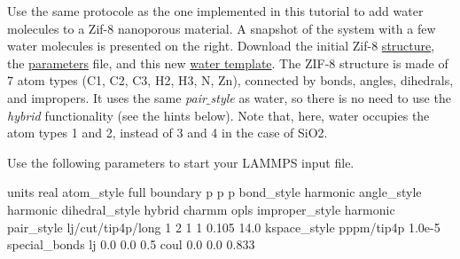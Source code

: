 \noindent Use the same protocole as the one implemented in this tutorial to add water
molecules to a Zif-8 nanoporous material. A snapshot of the system with a 
few water molecules is presented on the right.
Download the initial Zif-8 \href{../../../../../inputs/level3/water-adsorption-in-silica/Exercises/Zif-8/zif-8.data}{structure}, the \href{../../../../../inputs/level3/water-adsorption-in-silica/Exercises/Zif-8/parm.lammps}{parameters} file, and this
new \href{../../../../../inputs/level3/water-adsorption-in-silica/Exercises/Zif-8/water.mol}{water template}. The ZIF-8 structure is made of 7 atom types (C1, C2, C3, H2, H3, N, Zn), connected
by bonds, angles, dihedrals, and impropers. It uses the same \textit{pair$\_$style} as water,
so there is no need to use the \textit{hybrid} functionality (see the hints below).
Note that, here, water occupies the atom types 1 and 2, instead of 3 and 4 in the case of SiO2.

\begin{tcolorbox}[colback=mylightblue!5!white,colframe=mylightblue!75!black,title=Hints]
Use the following parameters to start your LAMMPS input file.
\begin{lcverbatim}
units real
atom_style full
boundary p p p
bond_style harmonic
angle_style harmonic
dihedral_style hybrid charmm opls
improper_style harmonic
pair_style lj/cut/tip4p/long 1 2 1 1 0.105 14.0
kspace_style pppm/tip4p 1.0e-5
special_bonds lj 0.0 0.0 0.5 coul 0.0 0.0 0.833
\end{lcverbatim}

\noindent \end{tcolorbox}

